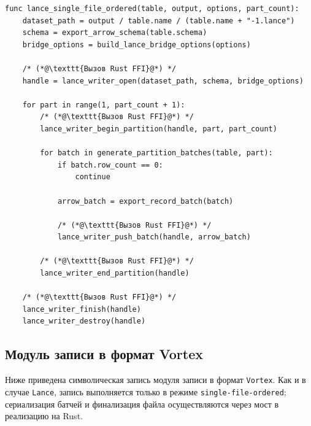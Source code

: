 \begin{lstlisting}[caption={Запись таблицы в формат Lance}]
func lance_single_file_ordered(table, output, options, part_count):
    dataset_path = output / table.name / (table.name + "-1.lance")
    schema = export_arrow_schema(table.schema)
    bridge_options = build_lance_bridge_options(options)

    /* (*@\texttt{Вызов Rust FFI}@*) */
    handle = lance_writer_open(dataset_path, schema, bridge_options)

    for part in range(1, part_count + 1):
        /* (*@\texttt{Вызов Rust FFI}@*) */
        lance_writer_begin_partition(handle, part, part_count)

        for batch in generate_partition_batches(table, part):
            if batch.row_count == 0:
                continue

            arrow_batch = export_record_batch(batch)

            /* (*@\texttt{Вызов Rust FFI}@*) */
            lance_writer_push_batch(handle, arrow_batch)

        /* (*@\texttt{Вызов Rust FFI}@*) */
        lance_writer_end_partition(handle)

    /* (*@\texttt{Вызов Rust FFI}@*) */
    lance_writer_finish(handle)
    lance_writer_destroy(handle)
\end{lstlisting}

\subsection{Модуль записи в формат Vortex}

Ниже приведена символическая запись модуля записи в формат \texttt{Vortex}. Как
и в случае \texttt{Lance}, запись выполняется только в режиме
\texttt{single-file-ordered}; сериализация батчей и финализация файла
осуществляются через мост в реализацию на Rust.

